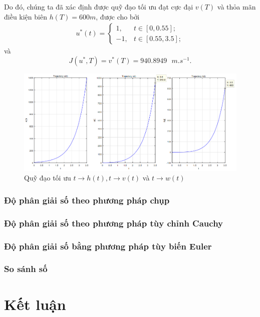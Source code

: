 \documentclass[12pt,a4paper]{report}
\begin{document}
Do đó, chúng ta đã xác định được quỹ đạo tối ưu đạt cực đại $v(T)$ và thỏa mãn điều kiện biên $h(T) = 600m$, được cho bởi
\begin{eqnarray}
u^*(t) =	\begin{cases}
		1, & t \in [0, 0.55];\\ -1, & t\in[0.55, 3.5];
	\end{cases}
\end{eqnarray} và $$J(u^*, T) = v^*(T) = 940.8949 \text{ } m.s^{-1}.$$

\begin{figure}[h]
	\centering
	\includegraphics[scale=.6]{./image/hinh3.png}
	\caption{Quỹ đạo tối ưu $t \to h(t), t\to v(t)$ và $t\to w(t)$}
\end{figure}
	\subsection{Độ phân giải số theo phương pháp chụp}
	
	\subsection{Độ phân giải số theo phương pháp tùy chỉnh Cauchy}
	
	\subsection{Độ phân giải số bằng phương pháp tùy biến Euler}
	
	\subsection{So sánh số}
	
	
	\chapter{Kết luận}
	
	
\end{document}
